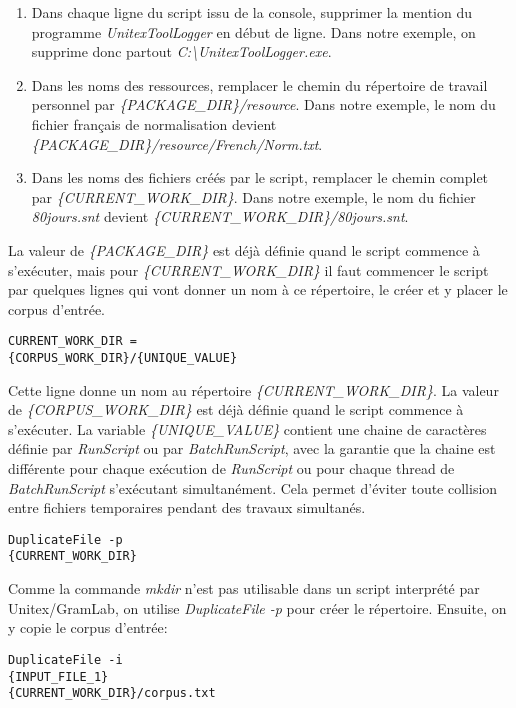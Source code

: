 \begin{enumerate}
\item Dans chaque ligne du script issu de la console, supprimer la mention du programme \emph{UnitexToolLogger} en début de ligne. Dans notre exemple, on supprime donc partout \emph{C:\textbackslash UnitexToolLogger.exe}.
\item Dans les noms des ressources, remplacer le chemin du répertoire de travail personnel par \emph{\{PACKAGE\_DIR\}/resource}. Dans notre exemple, le nom du fichier français de normalisation devient \emph{\{PACKAGE\_DIR\}/resource/French/Norm.txt}.
\item Dans les noms des fichiers créés par le script, remplacer le chemin complet par \emph{\{CURRENT\_WORK\_DIR\}}. Dans notre exemple, le nom du fichier \emph{80jours.snt} devient \emph{\{CURRENT\_WORK\_DIR\}/80jours.snt}.
\end{enumerate}

\bigskip
\noindent La valeur de \emph{\{PACKAGE\_DIR\}} est déjà définie quand le script commence à s'exécuter, mais pour \emph{\{CURRENT\_WORK\_DIR\}} il faut commencer le script par quelques lignes qui vont donner un nom à ce répertoire, le créer et y placer le corpus d'entrée.

\begin{verbatim}
CURRENT_WORK_DIR = 
{CORPUS_WORK_DIR}/{UNIQUE_VALUE}
\end{verbatim}

\bigskip
\noindent Cette ligne donne un nom au répertoire \emph{\{CURRENT\_WORK\_DIR\}}. La valeur de \emph{\{CORPUS\_WORK\_DIR\}} est déjà définie quand le script commence à s'exécuter. La variable \emph{\{UNIQUE\_VALUE\}} contient une chaine de caractères définie par \emph{RunScript} ou par \emph{BatchRunScript}, avec la garantie que la chaine est différente pour chaque exécution de \emph{RunScript} ou pour chaque thread de \emph{BatchRunScript} s’exécutant simultanément. Cela permet d'éviter toute collision entre fichiers temporaires pendant des travaux simultanés.

\begin{verbatim}
DuplicateFile -p 
{CURRENT_WORK_DIR}
\end{verbatim}

\bigskip
\noindent Comme la commande \emph{mkdir} n’est pas utilisable dans un script interprété par Unitex/GramLab, on utilise \emph{DuplicateFile -p} pour créer le répertoire. Ensuite, on y copie le corpus d’entrée:

\begin{verbatim}
DuplicateFile -i 
{INPUT_FILE_1} 
{CURRENT_WORK_DIR}/corpus.txt
\end{verbatim}

